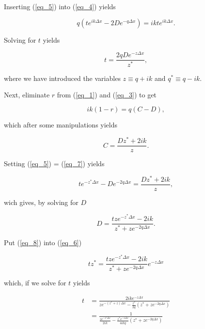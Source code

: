 \documentclass{article}
\begin{document}
Inserting (\ref{eq_5}) into (\ref{eq_4}) yields

\begin{equation}
q(te^{ik\Delta x} - 2De^{-q\Delta x}) = ikte^{ik\Delta x}.
\end{equation}

Solving for $t$ yields

\begin{equation}
    t = \frac{2qDe^{-z\Delta x}}{z^*}, \label{eq_6}
\end{equation}

where we have introduced the variables $z \equiv q + ik$ and $q^* \equiv q - ik$.

Next, eliminate $r$ from (\ref{eq_1}) and (\ref{eq_3}) to get

\begin{equation}
ik(1 - r) = q(C - D),
\end{equation}

which after some manipulations yields

\begin{equation}
C = \frac{Dz^* + 2ik}{z} \label{eq_7}.
\end{equation}

Setting (\ref{eq_5}) = (\ref{eq_7}) yields

\begin{equation}
te^{-z^*\Delta x} - De^{-2q\Delta x} = \frac{Dz^* + 2ik}{z},
\end{equation}

wich gives, by solving for $D$

\begin{equation}
D = \frac{tze^{-z^*\Delta x} - 2ik}{z^* + ze^{-2q\Delta x}} \label{eq_8}.
\end{equation}

Put (\ref{eq_8}) into (\ref{eq_6})

\begin{equation}
tz^* = \frac{tze^{-z^*\Delta x} - 2ik}{z^* + ze^{-2q\Delta x}}e^{-z\Delta x}
\end{equation}

which, if we solve for $t$ yields

\begin{align}
t &= \frac{2ike^{-z\Delta x}}{ze^{-(z^* + z)\Delta x} - \frac{z^*}{2q}(z^*+ze^{-2q\Delta x})} \\
  &= \frac{1}{\frac{ze^{-z^*\Delta x}}{2ik} - \frac{z^*e^{-z\Delta x}}{4ikq}(z^* + ze^{-2q\Delta x})}
\end{align}
\end{document}
